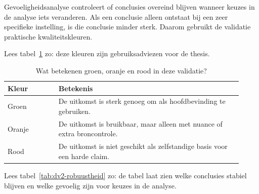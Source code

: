 Gevoeligheidsanalyse controleert of conclusies overeind blijven wanneer keuzes in de analyse iets veranderen. Als een conclusie alleen ontstaat bij een zeer specifieke instelling, is die conclusie minder sterk. Daarom gebruikt de validatie praktische kwaliteitskleuren.

Lees tabel~\ref{tab:dv2-kleurcodes} zo: deze kleuren zijn gebruiksadviezen voor de thesis.

\begin{table}[htbp]
\centering
\small
\caption{Wat betekenen groen, oranje en rood in deze validatie?}
\label{tab:dv2-kleurcodes}
\begin{tabular}{p{0.20\linewidth}p{0.72\linewidth}}
\hline
Kleur & Betekenis \\
\hline
Groen & De uitkomst is sterk genoeg om als hoofdbevinding te gebruiken. \\
Oranje & De uitkomst is bruikbaar, maar alleen met nuance of extra broncontrole. \\
Rood & De uitkomst is niet geschikt als zelfstandige basis voor een harde claim. \\
\hline
\end{tabular}
\end{table}

Lees tabel~\ref{tab:dv2-robuustheid} zo: de tabel laat zien welke conclusies stabiel blijven en welke gevoelig zijn voor keuzes in de analyse.

